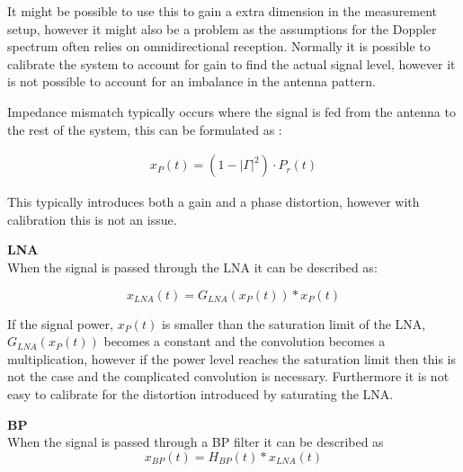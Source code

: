 It might be possible to use this to gain a extra dimension in the measurement setup, however it might also be a problem as the assumptions for the Doppler spectrum often relies on omnidirectional reception. Normally it is possible to calibrate the system to account for gain to find the actual signal level, however it is not possible to account for an imbalance in the antenna pattern. 


Impedance mismatch typically occurs where the signal is fed from the antenna to the rest of the system, this can be formulated as \citep[p. 63]{balanis}:

\begin{align}
x_P(t) = (1-|\Gamma|^2)\cdot P_r(t) \label{eq:ref_power}
\end{align}
\begin{where}
\end{where}

This typically introduces both a gain and a phase distortion, however with calibration this is not an issue.

\textbf{\Gls{LNA}}\\
When the signal is passed through the LNA it can be described as:

\begin{equation}
x_{LNA}(t) = G_{LNA}\left(x_P(t)\right)*x_P(t)
\end{equation}
\begin{where}
\end{where}

If the signal power, $x_P(t)$ is smaller than the saturation limit of the LNA, $G_{LNA}\left(x_P(t)\right)$ becomes a constant and the convolution becomes a multiplication, however if the power level reaches the saturation limit then this is not the case and the complicated convolution is necessary. Furthermore it is not easy to calibrate for the distortion introduced by saturating the LNA.


\textbf{\Gls{BP}}\\
When the signal is passed through a BP filter it can be described as
\begin{equation}
x_{BP}(t) = H_{BP}(t)*x_{LNA}(t)
\end{equation}
\begin{where}
\end{where}

